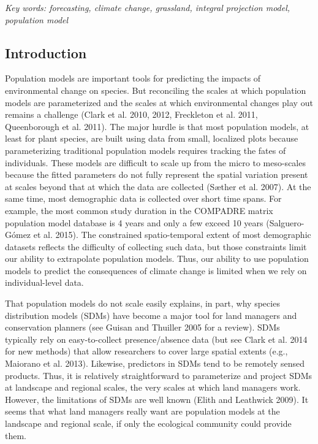 \documentclass[12pt,]{article}
\begin{document}
\emph{Key words: forecasting, climate change, grassland, integral
projection model, population model}

\subsection{Introduction}\label{introduction}

Population models are important tools for predicting the impacts of
environmental change on species. But reconciling the scales at which
population models are parameterized and the scales at which
environmental changes play out remains a challenge (Clark et al. 2010,
2012, Freckleton et al. 2011, Queenborough et al. 2011). The major
hurdle is that most population models, at least for plant species, are
built using data from small, localized plots because parameterizing
traditional population models requires tracking the fates of
individuals. These models are difficult to scale up from the micro to
meso-scales because the fitted parameters do not fully represent the
spatial variation present at scales beyond that at which the data are
collected (Sæther et al. 2007). At the same time, most demographic data
is collected over short time spans. For example, the most common study
duration in the COMPADRE matrix population model database is 4 years and
only a few exceed 10 years (Salguero-Gómez et al. 2015). The constrained
spatio-temporal extent of most demographic datasets reflects the
difficulty of collecting such data, but those constraints limit our
ability to extrapolate population models. Thus, our ability to use
population models to predict the consequences of climate change is
limited when we rely on individual-level data.

That population models do not scale easily explains, in part, why
species distribution models (SDMs) have become a major tool for land
managers and conservation planners (see Guisan and Thuiller 2005 for a
review). SDMs typically rely on easy-to-collect presence/absence data
(but see Clark et al. 2014 for new methods) that allow researchers to
cover large spatial extents (e.g., Maiorano et al. 2013). Likewise,
predictors in SDMs tend to be remotely sensed products. Thus, it is
relatively straightforward to parameterize and project SDMs at landscape
and regional scales, the very scales at which land managers work.
However, the limitations of SDMs are well known (Elith and Leathwick
2009). It seems that what land managers really want are population
models at the landscape and regional scale, if only the ecological
community could provide them.
\end{document}
